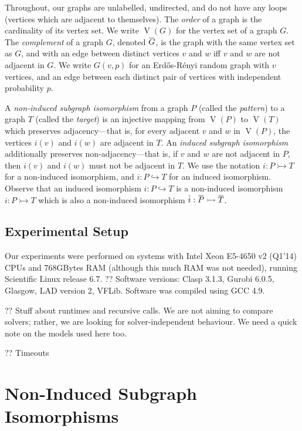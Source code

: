 \documentclass[letterpaper]{article}
\newcommand{\shortoverline}[1]{\mkern 1.5mu\overline{\mkern-1.5mu#1\mkern-1.5mu}\mkern 1.5mu}
\begin{document}
Throughout, our graphs are unlabelled, undirected, and do not have any loops (vertices which are
adjacent to themselves).  The \emph{order} of a graph is the cardinality of its vertex set. We write
$\operatorname{V}(G)$ for the vertex set of a graph $G$. The \emph{complement} of a graph $G$,
denoted $\shortoverline{G}$, is the
graph with the same vertex set as $G$, and with an edge between distinct vertices $v$ and $w$ iff
$v$ and $w$ are not adjacent in $G$. We write $G(v, p)$ for an Erd\H{o}s-R\'enyi random graph with
$v$ vertices, and an edge between each distinct pair of vertices with independent probability $p$.

A \emph{non-induced subgraph isomorphism} from a graph $P$ (called the \emph{pattern}) to a graph
$T$ (called the \emph{target}) is an injective mapping from $\operatorname{V}(P)$ to
$\operatorname{V}(T)$ which preserves adjacency---that is, for every adjacent $v$ and $w$ in
$\operatorname{V}(P)$, the vertices $i(v)$ and $i(w)$ are adjacent in $T$. An \emph{induced subgraph
isomorphism} additionally preserves non-adjacency---that is, if $v$ and $w$ are not adjacent in $P$,
then $i(v)$ and $i(w)$ must not be adjacent in $T$. We use the notation $i : P \rightarrowtail T$
for a non-induced isomorphism, and $i : P \hookrightarrow T$ for an induced isomorphism. Observe
that an induced isomorphism $i : P \hookrightarrow T$ is a non-induced isomorphism $i : P
\rightarrowtail T$ which is also a non-induced isomorphism $\shortoverline{i} : \shortoverline{P}
\rightarrowtail \shortoverline{T}$.

\subsection{Experimental Setup}

Our experiments were performed on systems with Intel Xeon E5-4650 v2 (Q1'14) CPUs and 768GBytes RAM
(although this much RAM was not needed), running Scientific Linux release 6.7.   ?? Software
versions: Clasp 3.1.3, Gurobi 6.0.5, Glasgow, LAD version 2, VFLib. Software was compiled using GCC
4.9.

?? Stuff about runtimes and recursive calls. We are not aiming to compare solvers; rather, we are
looking for solver-independent behaviour. We need a quick note on the models used here too.

?? Timeouts

\section{Non-Induced Subgraph Isomorphisms}
\end{document}
